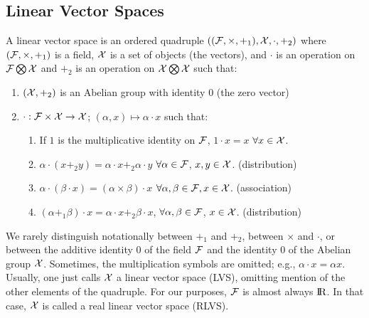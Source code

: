 \subsection{Linear Vector Spaces}
\begin{Definition}
        A linear vector space is an ordered quadruple
        $\left ( ({\cal F}, \times, +_1), {\cal X}, \cdot, +_2 \right )$
        where $({\cal F}, \times, +_1)$ is a field, ${\cal X}$ is a set of objects (the vectors),
        and $\cdot$ is an operation on ${\cal F} \bigotimes {\cal X}$ and $+_2$ is
        an operation on ${\cal X} \bigotimes {\cal X}$ such that:
        \begin{enumerate}
                \item $({\cal X}, +_2)$ is an Abelian group with identity 0 (the zero vector)
                \item $\cdot : {\cal F} \times {\cal X} \rightarrow {\cal X}$; $(\alpha, x) \mapsto \alpha \cdot x$
                        such that:
                        \begin{enumerate}
                                \item If $1$ is the multiplicative identity on ${\cal F}$, $1 \cdot x = x$
                                        $\forall x \in {\cal X}$.
                                \item $\alpha \cdot (x +_2 y) = \alpha \cdot x +_2 \alpha \cdot y$
                                        $\forall \alpha \in {\cal F}$, $x, y \in {\cal X}$. (distribution)
                                \item $\alpha \cdot (\beta \cdot x) = (\alpha \times \beta) \cdot x$
                                        $\forall \alpha, \beta \in {\cal F}, x \in {\cal X}$. (association)
                                \item $(\alpha +_1 \beta) \cdot x = \alpha \cdot x +_2 \beta \cdot x$,
                                        $\forall \alpha, \beta \in {\cal F}$, $x \in {\cal X}$. (distribution)
                        \end{enumerate}
        \end{enumerate}
\end{Definition}
We rarely distinguish notationally between $+_1$ and $+_2$, between $\times$ and $\cdot$,
or between the additive identity $0$ of the field ${\cal F}$ and the identity $0$
of the Abelian group ${\cal X}$.
Sometimes, the multiplication symbols are omitted; e.g., $\alpha \cdot x = \alpha x$.
Usually, one just calls ${\cal X}$ a linear vector space (LVS), omitting mention of the other elements of
the quadruple.
For our purposes, ${\cal F}$ is almost always $\hbox{I\kern-.17em\hbox{R}}$.
In that case, ${\cal X}$ is called a real linear vector space (RLVS).


